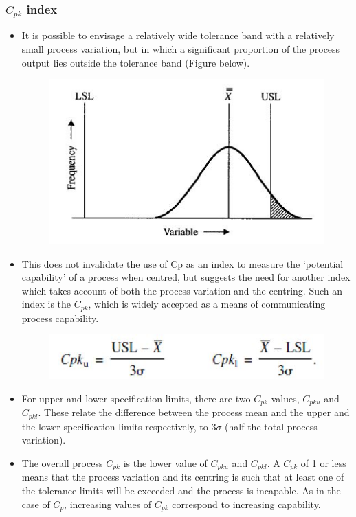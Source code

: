 \documentclass[MASTER-SPC.tex]{subfiles}
\begin{document}
\newpage	
	\subsubsection*{$C_{pk}$ index}
\begin{itemize}
\item It is possible to envisage a relatively wide tolerance band with a relatively
	small process variation, but in which a significant proportion of the process output lies outside the tolerance band (Figure below). 
	
	\begin{figure}[h!]
		\centering
		\includegraphics[width=0.7\linewidth]{proccapindices/image3}
	\end{figure}
	
\item This does not invalidate the use of Cp as an index to measure the ‘potential capability’ of a process when centred, but suggests the need for another index which takes account of both the process variation and the centring. Such an index is the $C_{pk}$, which is widely accepted as a means of communicating process capability.
	
	\begin{figure}[h!]
		\centering
		\includegraphics[width=0.7\linewidth]{proccapindices/image4}
	\end{figure}
	
\item 	For upper and lower specification limits, there are two $C_{pk}$ values,
	$C_{pku}$ and $C_{pkl}$. These relate the difference between the process mean and the upper and the lower specification limits respectively, to $3\sigma$ (half the total process variation).
	
\item	The overall process $C_{pk}$ is the lower value of $C_{pku}$ and $C_{pkl}$. A $C_{pk}$ of 1 or less means that the process variation and its centring is such that at least one of the tolerance limits will be exceeded and the process is incapable. As in the case of $C_p$, increasing values of $C_{pk}$ correspond to increasing capability. 
	

\end{itemize}
\end{document}
